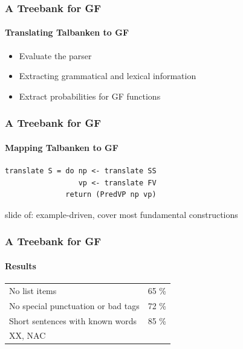 \documentclass[10pt]{beamer}
\begin{document}
\begin{frame}
\frametitle{A Treebank for GF}
\framesubtitle{Translating Talbanken to GF} 
\begin{itemize}
\item{Evaluate the parser}
\pause
\item{Extracting grammatical and lexical information}
\pause
\item{Extract probabilities for GF functions}
\end{itemize}
\end{frame}

\begin{frame}[containsverbatim]
\frametitle{A Treebank for GF}
\framesubtitle{Mapping Talbanken to GF} 
\begin{verbatim}
translate S = do np <- translate SS
                 vp <- translate FV
              return (PredVP np vp)
\end{verbatim}
\end{frame}

\begin{frame}
slide of: example-driven, cover most fundamental constructions
\end{frame}


\begin{frame}[containsverbatim]
\frametitle{A Treebank for GF}
\framesubtitle{Results} 
\begin{tabular}{ll}
No list items & 65 \%\\
No special punctuation or bad tags& 72 \%\\
Short sentences with known words & 85 \%\\
XX, NAC
\end{tabular}
\end{frame}
\end{document}
